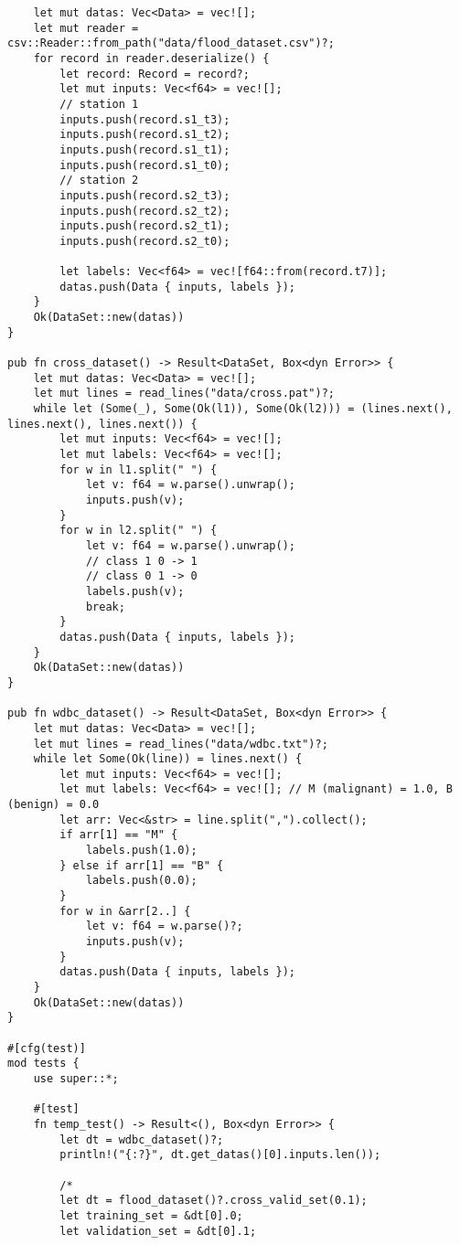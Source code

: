\begin{code}
\begin{verbatim}
    let mut datas: Vec<Data> = vec![];
    let mut reader = csv::Reader::from_path("data/flood_dataset.csv")?;
    for record in reader.deserialize() {
        let record: Record = record?;
        let mut inputs: Vec<f64> = vec![];
        // station 1
        inputs.push(record.s1_t3);
        inputs.push(record.s1_t2);
        inputs.push(record.s1_t1);
        inputs.push(record.s1_t0);
        // station 2
        inputs.push(record.s2_t3);
        inputs.push(record.s2_t2);
        inputs.push(record.s2_t1);
        inputs.push(record.s2_t0);

        let labels: Vec<f64> = vec![f64::from(record.t7)];
        datas.push(Data { inputs, labels });
    }
    Ok(DataSet::new(datas))
}

pub fn cross_dataset() -> Result<DataSet, Box<dyn Error>> {
    let mut datas: Vec<Data> = vec![];
    let mut lines = read_lines("data/cross.pat")?;
    while let (Some(_), Some(Ok(l1)), Some(Ok(l2))) = (lines.next(), lines.next(), lines.next()) {
        let mut inputs: Vec<f64> = vec![];
        let mut labels: Vec<f64> = vec![];
        for w in l1.split(" ") {
            let v: f64 = w.parse().unwrap();
            inputs.push(v);
        }
        for w in l2.split(" ") {
            let v: f64 = w.parse().unwrap();
            // class 1 0 -> 1
            // class 0 1 -> 0
            labels.push(v);
            break;
        }
        datas.push(Data { inputs, labels });
    }
    Ok(DataSet::new(datas))
}

pub fn wdbc_dataset() -> Result<DataSet, Box<dyn Error>> {
    let mut datas: Vec<Data> = vec![];
    let mut lines = read_lines("data/wdbc.txt")?;
    while let Some(Ok(line)) = lines.next() {
        let mut inputs: Vec<f64> = vec![];
        let mut labels: Vec<f64> = vec![]; // M (malignant) = 1.0, B (benign) = 0.0
        let arr: Vec<&str> = line.split(",").collect();
        if arr[1] == "M" {
            labels.push(1.0);
        } else if arr[1] == "B" {
            labels.push(0.0);
        }
        for w in &arr[2..] {
            let v: f64 = w.parse()?;
            inputs.push(v);
        }
        datas.push(Data { inputs, labels });
    }
    Ok(DataSet::new(datas))
}

#[cfg(test)]
mod tests {
    use super::*;

    #[test]
    fn temp_test() -> Result<(), Box<dyn Error>> {
        let dt = wdbc_dataset()?;
        println!("{:?}", dt.get_datas()[0].inputs.len());

        /*
        let dt = flood_dataset()?.cross_valid_set(0.1);
        let training_set = &dt[0].0;
        let validation_set = &dt[0].1;


\end{verbatim}
\end{code}
